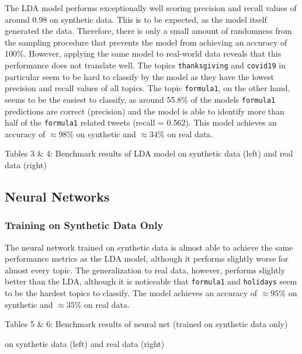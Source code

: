 \documentclass[11pt]{article}
\begin{document}
The LDA model performs exceptionally well scoring precision and recall values of around 0.98 on synthetic data. This is to be expected, as the model itself generated the data. Therefore, there is only a small amount of randomness from the sampling procedure that prevents the model from achieving an accuracy of 100\%. However, applying the same model to real-world data reveals that this performance does not translate well. The topics \texttt{thanksgiving} and \texttt{covid19} in particular seem to be hard to classify by the model as they have the lowest precision and recall values of all topics. The topic \texttt{formula1}, on the other hand, seems to be the easiest to classify, as around 55.8\% of the models \texttt{formula1} predictions are correct (precision) and the model is able to identify more than half of the \texttt{formula1} related tweets (recall = 0.562).
This model achieves an accuracy of $\approx 98\%$ on synthetic and $\approx 34\%$ on real data.

\begin{center}

\qquad

\end{center}
\begin{center}
Tables 3 \& 4: Benchmark results of LDA model on synthetic data (left) and real data (right)
\end{center}

\subsection{Neural Networks}
\subsubsection{Training on Synthetic Data Only}
The neural network trained on synthetic data is almost able to achieve the same performance metrics as the LDA model, although it performs slightly worse for almost every topic. The generalization to real data, however, performs slightly better than the LDA, although it is noticeable that \texttt{formula1} and \texttt{holidays} seem to be the hardest topics to classify.
The model achieves an accuracy of $\approx 95\%$ on synthetic and $\approx 35\%$ on real data.

\begin{center}
	
\qquad

\end{center}
\begin{center}
Tables 5 \& 6: Benchmark results of neural net (trained on synthetic data only) 

on synthetic data (left) and real data (right)
\end{center}
\end{document}
